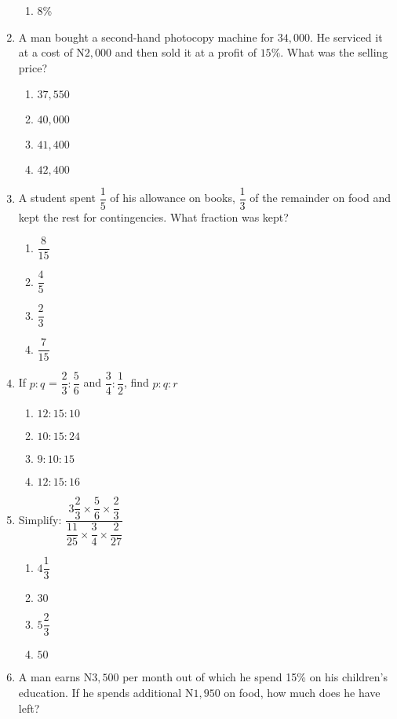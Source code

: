 \begin{multicols}{2}
\begin{enumerate}[label={\arabic*.}]
\begin{enumerate}[label={\Alph*.}]
    \item \(8\)\%
    \end{enumerate}
\item A man bought a second-hand photocopy machine for \(34,000\). He serviced it at a cost of N\(2,000\) and then sold it at a profit of \(15\%\). What was the selling price? 
    \begin{enumerate}[label={\Alph*.}]
    \item \(37,550\)
    \item \(40,000\)
    \item \(41,400\)
    \item \(42,400\)
    \end{enumerate}
\item A student spent \(\dfrac{1}{5}\) of his allowance on books, \(\dfrac{1}{3}\) of the remainder on food and kept the rest for contingencies. 
What fraction was kept?
    \begin{enumerate}[label={\Alph*.}]
    \item \(\dfrac{8}{15}\)
    \item \(\dfrac{4}{5}\)
    \item \(\dfrac{2}{3}\)
    \item \(\dfrac{7}{15}\)
    \end{enumerate}
\item If \(p:q\) = \(\dfrac{2}{3}:\dfrac{5}{6}\) and \(\dfrac{3}{4}:\dfrac{1}{2}\), find \(p:q:r\)
    \begin{enumerate}[label={\Alph*.}]
    \item \(12:15:10\)
    \item \(10:15:24\)
    \item \(9:10:15\)
    \item \(12:15:16\)
    \end{enumerate}
\item Simplify: \(\dfrac{3\dfrac{2}{3}\times\dfrac{5}{6}\times\dfrac{2}{3}}{\dfrac{11}{25}\times\dfrac{3}{4}\times\dfrac{2}{27}}\)
    \begin{enumerate}[label={\Alph*.}]
    \item \(4\dfrac{1}{3}\)
    \item \(30\)
    \item \(5\dfrac{2}{3}\)
    \item \(50\)
    \end{enumerate}
\item A man earns N\(3,500\) per month out of which he spend 15\% on his children's education. If he spends additional N\(1,950\) on food, how much does he have left? 

\end{enumerate}
\end{multicols}
